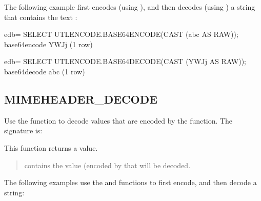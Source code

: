 \documentclass[letterpaper,10pt,english,openany,oneside]{sphinxmanual}
\begin{document}

The following example first encodes (using ), and then
decodes (using ) a string that contains the text :

%
\begin{sphinxVerbatim}[commandchars=\\\{\}]
edb=\PYGZsh{} SELECT UTL\PYGZus{}ENCODE.BASE64\PYGZus{}ENCODE(CAST (\PYGZsq{}abc\PYGZsq{} AS RAW));
 base64\PYGZus{}encode
\PYGZhy{}\PYGZhy{}\PYGZhy{}\PYGZhy{}\PYGZhy{}\PYGZhy{}\PYGZhy{}\PYGZhy{}\PYGZhy{}\PYGZhy{}\PYGZhy{}\PYGZhy{}\PYGZhy{}\PYGZhy{}\PYGZhy{}
 YWJj
(1 row)

edb=\PYGZsh{} SELECT UTL\PYGZus{}ENCODE.BASE64\PYGZus{}DECODE(CAST (\PYGZsq{}YWJj\PYGZsq{} AS RAW));
 base64\PYGZus{}decode
\PYGZhy{}\PYGZhy{}\PYGZhy{}\PYGZhy{}\PYGZhy{}\PYGZhy{}\PYGZhy{}\PYGZhy{}\PYGZhy{}\PYGZhy{}\PYGZhy{}\PYGZhy{}\PYGZhy{}\PYGZhy{}\PYGZhy{}
 abc
(1 row)
\end{sphinxVerbatim}

\newpage


\subsection{MIMEHEADER\_DECODE}
\label{\detokenize{mimeheader_decode::doc}}\label{\detokenize{mimeheader_decode:mimeheader-decode}}
Use the  function to decode values that are encoded by
the  function. The signature is:
\begin{quote}

\end{quote}

This function returns a  value.


\begin{quote}

 contains the value (encoded by  that will
be decoded.
\end{quote}


The following examples use the  and 
functions to first encode, and then decode a string:
\end{document}
